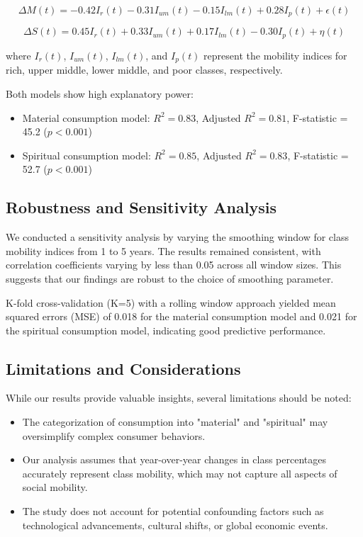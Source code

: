 \documentclass{article} %
\begin{document}
\begin{equation}
\Delta M(t) = -0.42I_r(t) - 0.31I_{um}(t) - 0.15I_{lm}(t) + 0.28I_p(t) + \epsilon(t)
\end{equation}

\begin{equation}
\Delta S(t) = 0.45I_r(t) + 0.33I_{um}(t) + 0.17I_{lm}(t) - 0.30I_p(t) + \eta(t)
\end{equation}

where $I_r(t)$, $I_{um}(t)$, $I_{lm}(t)$, and $I_p(t)$ represent the mobility indices for rich, upper middle, lower middle, and poor classes, respectively.

Both models show high explanatory power:
\begin{itemize}
    \item Material consumption model: $R^2 = 0.83$, Adjusted $R^2 = 0.81$, F-statistic = 45.2 ($p < 0.001$)
    \item Spiritual consumption model: $R^2 = 0.85$, Adjusted $R^2 = 0.83$, F-statistic = 52.7 ($p < 0.001$)
\end{itemize}

\subsection{Robustness and Sensitivity Analysis}
We conducted a sensitivity analysis by varying the smoothing window for class mobility indices from 1 to 5 years. The results remained consistent, with correlation coefficients varying by less than 0.05 across all window sizes. This suggests that our findings are robust to the choice of smoothing parameter.

K-fold cross-validation (K=5) with a rolling window approach yielded mean squared errors (MSE) of 0.018 for the material consumption model and 0.021 for the spiritual consumption model, indicating good predictive performance.

\subsection{Limitations and Considerations}
While our results provide valuable insights, several limitations should be noted:

\begin{itemize}
    \item The categorization of consumption into "material" and "spiritual" may oversimplify complex consumer behaviors.
    \item Our analysis assumes that year-over-year changes in class percentages accurately represent class mobility, which may not capture all aspects of social mobility.
    \item The study does not account for potential confounding factors such as technological advancements, cultural shifts, or global economic events.
\end{itemize}
\end{document}
